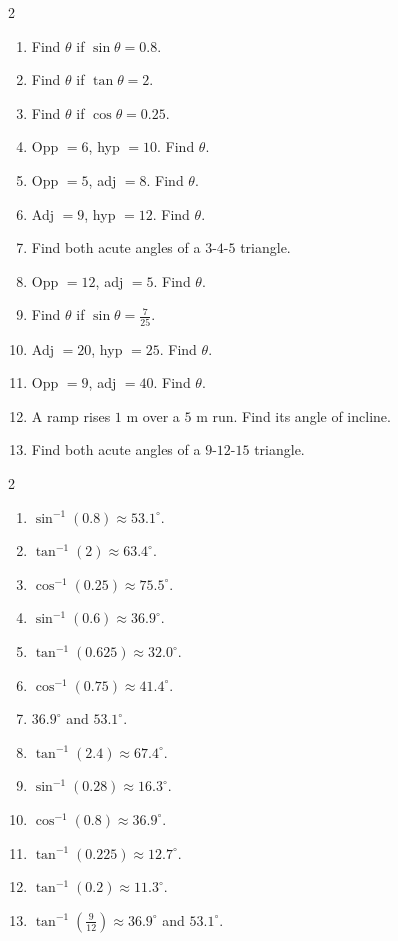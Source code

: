 \documentclass[11pt]{article}
\begin{document}
\begin{recapbox}
\begin{multicols}{2}
\small
\begin{enumerate}[leftmargin=*,itemsep=3pt]
  \item Find $\theta$ if $\sin\theta=0.8$.
  \item Find $\theta$ if $\tan\theta=2$.
  \item Find $\theta$ if $\cos\theta=0.25$.
  \item Opp $=6$, hyp $=10$. Find $\theta$.
  \item Opp $=5$, adj $=8$. Find $\theta$.
  \item Adj $=9$, hyp $=12$. Find $\theta$.
  \item Find both acute angles of a $3$-$4$-$5$ triangle.
  \item Opp $=12$, adj $=5$. Find $\theta$.
  \item Find $\theta$ if $\sin\theta=\tfrac{7}{25}$.
  \item Adj $=20$, hyp $=25$. Find $\theta$.
  \item Opp $=9$, adj $=40$. Find $\theta$.
  \item A ramp rises $1$ m over a $5$ m run. Find its angle of incline.
  \item Find both acute angles of a $9$-$12$-$15$ triangle.
\end{enumerate}
\end{multicols}
\end{recapbox}

\begin{keybox}
\begin{multicols}{2}
\small
\begin{enumerate}[leftmargin=*,itemsep=3pt]
  \item $\sin^{-1}(0.8)\approx53.1^\circ$.
  \item $\tan^{-1}(2)\approx63.4^\circ$.
  \item $\cos^{-1}(0.25)\approx75.5^\circ$.
  \item $\sin^{-1}(0.6)\approx36.9^\circ$.
  \item $\tan^{-1}(0.625)\approx32.0^\circ$.
  \item $\cos^{-1}(0.75)\approx41.4^\circ$.
  \item $36.9^\circ$ and $53.1^\circ$.
  \item $\tan^{-1}(2.4)\approx67.4^\circ$.
  \item $\sin^{-1}(0.28)\approx16.3^\circ$.
  \item $\cos^{-1}(0.8)\approx36.9^\circ$.
  \item $\tan^{-1}(0.225)\approx12.7^\circ$.
  \item $\tan^{-1}(0.2)\approx11.3^\circ$.
  \item $\tan^{-1}(\tfrac{9}{12})\approx36.9^\circ$ and $53.1^\circ$.
\end{enumerate}
\end{multicols}
\end{keybox}
\end{document}
